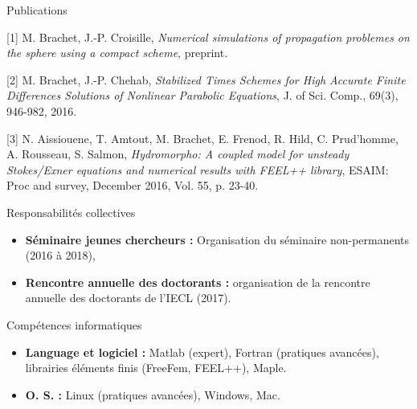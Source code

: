 \documentclass[10pt,a4paper]{report}
\def\cvpart{\noindent \hrulefill}
\def\sp{\vspace{6mm}}
\begin{document}
\sp
{\selectfont
\begin{Large}
Publications
\end{Large}
\cvpart
}
\sp

[1] {\sc  M. Brachet, J.-P. Croisille}, {\sl Numerical simulations of propagation problemes on the sphere using a compact scheme}, preprint.

\vspace{0.6cm}

[2] {\sc M. Brachet, J.-P. Chehab}, {\sl Stabilized Times Schemes for High Accurate Finite Differences Solutions of Nonlinear Parabolic Equations}, J. of Sci. Comp., 69(3), 946-982, 2016.

\vspace{0.6cm}

[3] {\sc  N. Aissiouene, T. Amtout, M. Brachet, E. Frenod, R. Hild, C. Prud'homme, A. Rousseau, S. Salmon}, {\sl  Hydromorpho: A coupled model for unsteady Stokes/Exner equations and numerical results with FEEL++ library}, ESAIM: Proc and survey, December 2016, Vol. 55, p. 23-40.




\sp
{\selectfont
\begin{Large}
Responsabilités collectives
\end{Large}
\hrulefill
}
\sp

\noindent
\begin{itemize}
\item \textbf{Séminaire jeunes chercheurs :} Organisation du séminaire non-permanents (2016 à 2018),
\item \textbf{Rencontre annuelle des doctorants :} organisation de la rencontre annuelle des doctorants de l'IECL (2017).
\end{itemize}








\newpage
\sp
{\selectfont
\begin{Large}
Compétences informatiques
\end{Large}
\hrulefill
}
\sp

\noindent
\begin{itemize}
\item \textbf{Language et logiciel :} Matlab (expert), Fortran (pratiques avancées), librairies éléments finis (FreeFem, FEEL++), Maple.
\item \textbf{O. S. :} Linux (pratiques avancées), Windows, Mac.
\end{itemize}
\end{document}
